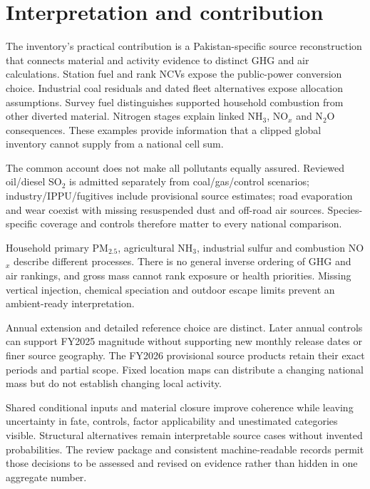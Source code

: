 \section{Interpretation and contribution}\label{sec:discussion}
The inventory's practical contribution is a Pakistan-specific source reconstruction that connects material and activity evidence to distinct GHG and air calculations. Station fuel and rank NCVs expose the public-power conversion choice. Industrial coal residuals and dated fleet alternatives expose allocation assumptions. Survey fuel distinguishes supported household combustion from other diverted material. Nitrogen stages explain linked NH$_3$, NO$_x$ and N$_2$O consequences. These examples provide information that a clipped global inventory cannot supply from a national cell sum.

The common account does not make all pollutants equally assured. Reviewed oil/diesel SO$_2$ is admitted separately from coal/gas/control scenarios; industry/IPPU/fugitives include provisional source estimates; road evaporation and wear coexist with missing resuspended dust and off-road air sources. Species-specific coverage and controls therefore matter to every national comparison.

Household primary PM$_{2.5}$, agricultural NH$_3$, industrial sulfur and combustion NO$_x$ describe different processes. There is no general inverse ordering of GHG and air rankings, and gross mass cannot rank exposure or health priorities. Missing vertical injection, chemical speciation and outdoor escape limits prevent an ambient-ready interpretation.

Annual extension and detailed reference choice are distinct. Later annual controls can support FY2025 magnitude without supporting new monthly release dates or finer source geography. The FY2026 provisional source products retain their exact periods and partial scope. Fixed location maps can distribute a changing national mass but do not establish changing local activity.

Shared conditional inputs and material closure improve coherence while leaving uncertainty in fate, controls, factor applicability and unestimated categories visible. Structural alternatives remain interpretable source cases without invented probabilities. The review package and consistent machine-readable records permit those decisions to be assessed and revised on evidence rather than hidden in one aggregate number.
